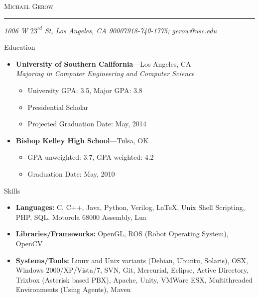 \documentclass[10pt,oneside]{article}
\makeatletter
\newcommand{\name}{Michael Gerow}
\newcommand{\addr}{1006 W $23^{rd}$ St, Los Angeles, CA 90007}
\newcommand{\phone}{918-740-1775}
\newcommand{\email}{gerow@usc.edu}
\newcommand{\bigname}[1]{
	\begin{center}\fontfamily{phv}\selectfont\Huge\scshape#1\end{center}
}
\newenvironment{ressection}[1]{
	\vspace{4pt}
	{\fontfamily{phv}\selectfont\Large#1}
	\begin{itemize}
	\vspace{3pt}
}{
	\end{itemize}
}
\newcommand{\resitem}[1]{
	\vspace{-4pt}
	\item \begin{flushleft} #1 \end{flushleft}
}
\newcommand{\ressubitem}[1]{
	\vspace{-1pt}
	\item \begin{flushleft} #1 \end{flushleft}
}
\newcommand{\resbigitem}[3]{
	\vspace{-5pt}
	\item
	\textbf{#1}---#2 \\
	\textit{#3}
}
\newcommand{\resshortbigitem}[2]{
	\vspace{-5pt}
	\item
	\textbf{#1}---#2
}
\newenvironment{ressubsec}[3]{
	\resbigitem{#1}{#2}{#3}
	\vspace{-2pt}
	\begin{itemize}
}{
	\end{itemize}
}
\newenvironment{resshortsubsec}[2]{
	\resshortbigitem{#1}{#2}
	\vspace{-2pt}
	\begin{itemize}
}{
	\end{itemize}
}
\makeatother
\begin{document}
 \selectfont

\bigname{\name}

\vspace{-8pt} \rule{\textwidth}{1pt}

\vspace{-1pt} {\small\itshape \addr \hfill \phone; \email}

\vspace{8 pt}




\begin{ressection}{Education}

	\begin{ressubsec}{University of Southern California}{Los Angeles, CA}{Majoring in Computer Engineering and Computer Science}
		\ressubitem{University GPA:  3.5, Major GPA: 3.8}
		\ressubitem{Presidential Scholar}
		\ressubitem{Projected Graduation Date:  May, 2014}
	\end{ressubsec}
	\begin{resshortsubsec}{Bishop Kelley High School}{Tulsa, OK}{}
		\ressubitem{GPA unweighted: 3.7, GPA weighted: 4.2}
		\ressubitem{Graduation Date: May, 2010}
	\end{resshortsubsec}

\end{ressection}

\begin{ressection}{Skills}

	\resitem{\textbf{Languages:} C, C++, Java, Python, Verilog, \LaTeX, Unix Shell Scripting, PHP, SQL, Motorola 68000 Assembly, Lua }
	\resitem{\textbf{Libraries/Frameworks:} OpenGL, ROS (Robot Operating System), OpenCV }
	\resitem{\textbf{Systems/Tools:} Linux and Unix variants (Debian, Ubuntu, Solaris), OSX, Windows 2000/XP/Vista/7, SVN, Git, Mercurial, Eclipse, Active Directory, Trixbox (Asterisk based PBX), Apache, Unity, VMWare ESX, Multithreaded Environments (Using Agents), Maven }
	
\end{ressection}


\end{document}
